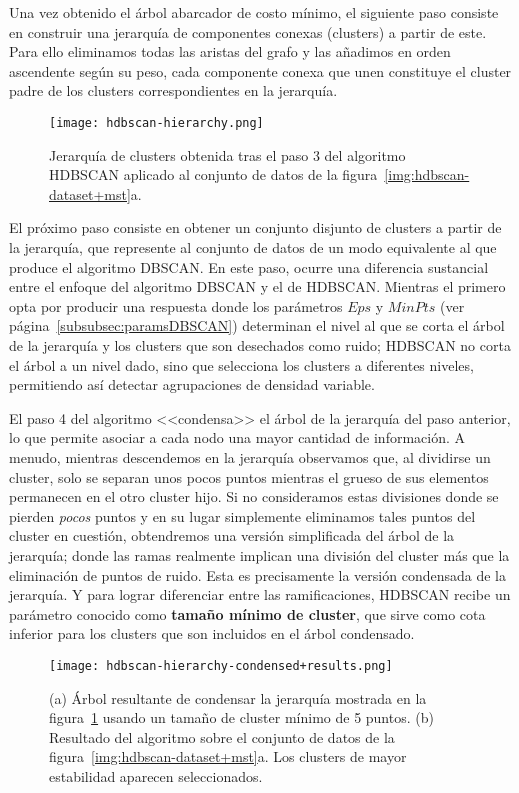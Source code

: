 Una vez obtenido el árbol abarcador de costo mínimo, el siguiente paso consiste en construir una jerarquía de componentes conexas (clusters) a partir de este.
Para ello eliminamos todas las aristas del grafo y las añadimos en orden ascendente según su peso, cada componente conexa que unen constituye el cluster padre de los clusters correspondientes en la jerarquía.

\begin{figure}[!h]
    \centering
    \texttt{[image: hdbscan-hierarchy.png]}
    \caption{Jerarquía de clusters obtenida tras el paso 3 del algoritmo HDBSCAN aplicado al conjunto de datos de la figura~\ref{img:hdbscan-dataset+mst}a.}
    \label{img:hdbscan-hierarchy}
\end{figure}

El próximo paso consiste en obtener un conjunto disjunto de clusters a partir de la jerarquía, que represente al conjunto de datos de un modo equivalente al que produce el algoritmo DBSCAN\@.
En este paso, ocurre una diferencia sustancial entre el enfoque del algoritmo DBSCAN y el de HDBSCAN\@.
Mientras el primero opta por producir una respuesta donde los parámetros $Eps$ y $MinPts$ (ver página~\ref{subsubsec:paramsDBSCAN}) determinan el nivel al que se corta el árbol de la jerarquía y los clusters que son desechados como ruido;
HDBSCAN no corta el árbol a un nivel dado, sino que selecciona los clusters a diferentes niveles, permitiendo así detectar agrupaciones de densidad variable.

El paso 4 del algoritmo <<condensa>> el árbol de la jerarquía del paso anterior, lo que permite asociar a cada nodo una mayor cantidad de información.
A menudo, mientras descendemos en la jerarquía observamos que, al dividirse un cluster, solo se separan unos pocos puntos mientras el grueso de sus elementos permanecen en el otro cluster hijo.
Si no consideramos estas divisiones donde se pierden \textit{pocos} puntos y en su lugar simplemente eliminamos tales puntos del cluster en cuestión, obtendremos una versión simplificada del árbol de la jerarquía;
donde las ramas realmente implican una división del cluster más que la eliminación de puntos de ruido.
Esta es precisamente la versión condensada de la jerarquía.
Y para lograr diferenciar entre las ramificaciones, HDBSCAN recibe un parámetro conocido como \textbf{tamaño mínimo de cluster}, que sirve como cota inferior para los clusters que son incluidos en el árbol condensado.

\begin{figure}[!h]
    \centering
    \texttt{[image: hdbscan-hierarchy-condensed+results.png]}
    \caption{(a) Árbol resultante de condensar la jerarquía mostrada en la figura~\ref{img:hdbscan-hierarchy} usando un tamaño de cluster mínimo de 5 puntos. (b) Resultado del algoritmo sobre el conjunto de datos de la figura~\ref{img:hdbscan-dataset+mst}a.
    Los clusters de mayor estabilidad aparecen seleccionados.}
    \label{img:hdbscan-hierarchy-condensed+results}
\end{figure}

